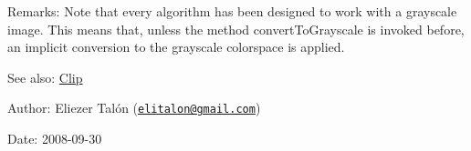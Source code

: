 \begin{Desc}
\item[Remarks:]Note that every algorithm has been designed to work with a grayscale image. This means that, unless the method convertToGrayscale is invoked before, an implicit conversion to the grayscale colorspace is applied.\end{Desc}
\begin{Desc}
\item[See also:]\hyperlink{class_clip}{Clip}\end{Desc}
\begin{Desc}
\item[Author:]Eliezer Talón (\href{mailto:elitalon@gmail.com}{\tt elitalon@gmail.com}) \end{Desc}
\begin{Desc}
\item[Date:]2008-09-30 \end{Desc}


